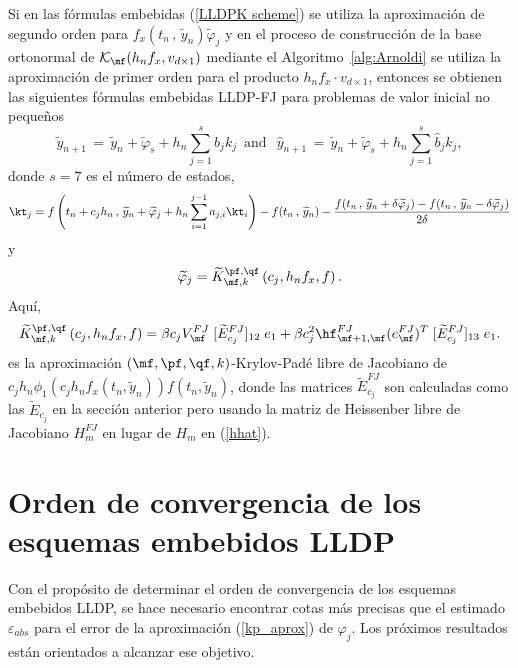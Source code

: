 Si en las fórmulas embebidas (\ref{LLDPK scheme}) se utiliza la aproximación de segundo orden para $f_x(t_n\, , \, \widetilde{y}_n)\widetilde{\varphi}_j$ y en el proceso de construcci\'on de la base ortonormal de $\mathcal{K}_\mf(h_nf_x,v_{d\times 1})$ mediante el Algoritmo~\ref{alg:Arnoldi} se utiliza la aproximaci\'on de primer orden para el producto $h_nf_x\cdot v_{d\times 1}$, entonces se obtienen las siguientes fórmulas embebidas LLDP-FJ para problemas de valor inicial no pequeños
\begin{equation}
\widetilde{y}_{n+1}\,=\,\widetilde{y}_n+\widetilde{\varphi}_s+h_n \sum_{j=1}^{s}b_j k_j \,\,\, \text{and} \,\,\, \
\widehat{y}_{n+1}\,=\, \widetilde{y}_n+\widetilde{\varphi}_s+h_n \sum_{j=1}^{s}\widehat{b}_j k_j,
\label{LLDPKFJ scheme}
\end{equation}
donde $s = 7$ es el número de estados,
\[ \kt_j = f\left( t_n+c_jh_n\, , \, \widetilde{y}_n+\widetilde{\varphi}_j+h_n \sum_{i=1}^{j-1}a_{j,i}\kt_i \right) - f(t_n\, ,\, \widetilde{y}_n) - \frac{f(t_n\, ,\, \widetilde{y}_n+\delta\widetilde{\varphi}_j)-f(t_n\, ,\, \widetilde{y}_n-\delta\widetilde{\varphi}_j)}{2\delta} \]
y
\[ \widetilde{\varphi }_j =\widetilde{K}_{\mf,k}^{\pf,\qf}\left(c_j,h_nf_x,f \right). \] Aquí, 
\begin{equation}
\widetilde{K}_{\mf,k}^{\pf,\qf}\left(c_j,h_nf_x , f \right)=\beta c_jV^{FJ}_{\mf}\;[\widetilde{E}^{FJ}_{c_j}]_{12}\; e_1 + \beta c_j^{2}\hf^{FJ}_{\mf+1,\mf}(e^{FJ}_\mf)^T\;[\widetilde{E}^{FJ}_{c_j}]_{13}\; e_1. \label{kp_fj_aprox}
\end{equation}
es la aproximaci\'on $(\mf , \pf ,\qf , k)$-Krylov-Padé libre de Jacobiano de
$c_jh_n\phi_1(c_jh_nf_x(t_n,\widetilde{y}_n))f(t_n,\widetilde{y}_n)$, donde las matrices $\widetilde{E}^{FJ}_{c_j}$ son calculadas como las $\widetilde{E}_{c_j}$ en la sección anterior pero usando la matriz de Heissenber libre de Jacobiano $H^{FJ}_m$ en lugar de $H_m$ en (\ref{hhat}).

\section{Orden de convergencia de los esquemas embebidos LLDP}

Con el propósito de determinar el orden de convergencia de los esquemas embebidos LLDP, se hace necesario encontrar cotas más precisas que el estimado $\varepsilon_{abs}$ para el error de la aproximación (\ref{kp_aprox}) de  $\varphi_j$. Los próximos resultados están orientados a alcanzar ese objetivo.

